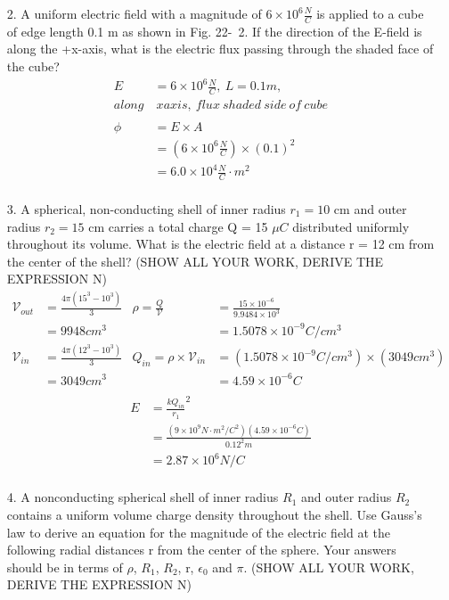 \documentclass{article}
\begin{document}
\begin{enumerate}
  \item[2.] A uniform electric field with a magnitude of \(6\times 10^6 \frac{N}{C}\) is applied to a cube of edge length 0.1 m as shown in Fig. 22-\ 2. If the direction of the E-field is along the +x-axis, what is the electric flux passing through the shaded face of the cube?
  \begin{align*}
    E &= 6\times 10^6\frac{N}{C},~L = 0.1m,\\along&~xaxis,~flux~shaded~side~of~cube\\ \\
    \phi &= E\times A\\
      &= (6\times 10^6\frac{N}{C})\times{(0.1)}^2\\
      &= \boxed{6.0 \times 10^4\frac{N}{C}\cdot{m^2}}\\
  \end{align*}
  \newpage
  \item[3.] A spherical, non-conducting shell of inner radius \(r_1 = 10\) cm and outer radius \(r_2 = 15\) cm carries a total charge Q = 15 \(\mu C\) distributed uniformly throughout its volume. What is the electric field at a distance r = 12 cm from the center of the shell? (SHOW ALL YOUR WORK, DERIVE THE EXPRESSION N)
    \begin{align*}
      \mathcal{V}_{out} &= \frac{4\pi(15^3-10^3)}{3} & \rho = \frac{Q}{\mathcal{V}} &= \frac{15 \times 10^{-6}}{9.9484 \times 10^3}\\
      &= 9948cm^3                                      & &= 1.5078\times 10^{-9} C/cm^3\\
      \mathcal{V}_{in} &= \frac{4\pi(12^3-10^3)}{3} & Q_{in} = \rho\times\mathcal{V}_{in} &=(1.5078\times 10^{-9} C/cm^3)\times(3049cm^3)\\
      &= 3049cm^3                                     & &= 4.59\times 10^{-6}C\\
    \end{align*}
    \begin{align*}
      E &= \frac{kQ_{in}}{r_1}^2\\
        &= \frac{(9\times 10^9 N\cdot m^2/C^2)(4.59\times 10^{-6}C)}{{0.12}^2m}\\
        &= \boxed{2.87 \times 10^6 N/C}\\
    \end{align*}
  \item[4.] A nonconducting spherical shell of inner radius \(R_1\) and outer radius \(R_2\) contains a uniform volume charge density throughout the shell. Use Gauss's law to derive an equation for the magnitude of the electric field at the following radial distances r from the center of the sphere. Your answers should be in terms of \(\rho \), \(R_1\), \(R_2\), r, \(\epsilon_0\) and \(\pi \). (SHOW ALL YOUR WORK, DERIVE THE EXPRESSION N)

\end{enumerate}
\end{document}
